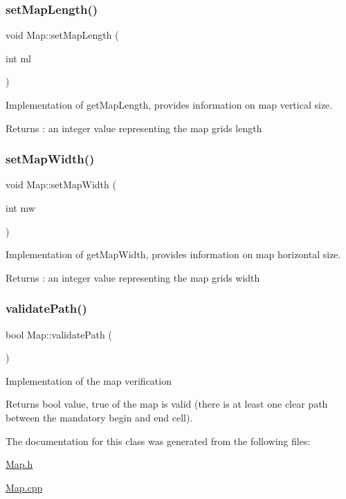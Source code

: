 \subsubsection{\texorpdfstring{set\+Map\+Length()}{setMapLength()}}
{\footnotesize\ttfamily void Map\+::set\+Map\+Length (\begin{DoxyParamCaption}\item[{int}]{ml }\end{DoxyParamCaption})}

Implementation of get\+Map\+Length, provides information on map vertical size. \begin{DoxyReturn}{Returns}
\+: an integer value representing the map grid\textquotesingle{}s length 
\end{DoxyReturn}
\hypertarget{classMap_a58b540416c67a94fba30bf513397cf45}{}\label{classMap_a58b540416c67a94fba30bf513397cf45} 
\subsubsection{\texorpdfstring{set\+Map\+Width()}{setMapWidth()}}
{\footnotesize\ttfamily void Map\+::set\+Map\+Width (\begin{DoxyParamCaption}\item[{int}]{mw }\end{DoxyParamCaption})}

Implementation of get\+Map\+Width, provides information on map horizontal size. \begin{DoxyReturn}{Returns}
\+: an integer value representing the map grid\textquotesingle{}s width 
\end{DoxyReturn}
\hypertarget{classMap_a91d9e239a9871b99a5d6d2d5d46b0504}{}\label{classMap_a91d9e239a9871b99a5d6d2d5d46b0504} 
\subsubsection{\texorpdfstring{validate\+Path()}{validatePath()}}
{\footnotesize\ttfamily bool Map\+::validate\+Path (\begin{DoxyParamCaption}{ }\end{DoxyParamCaption})}

Implementation of the map verification \begin{DoxyReturn}{Returns}
bool value, true of the map is valid (there is at least one clear path between the mandatory begin and end cell). 
\end{DoxyReturn}


The documentation for this class was generated from the following files\+:\begin{DoxyCompactItemize}
\item 
\hyperlink{Map_8h}{Map.\+h}\item 
\hyperlink{Map_8cpp}{Map.\+cpp}\end{DoxyCompactItemize}
